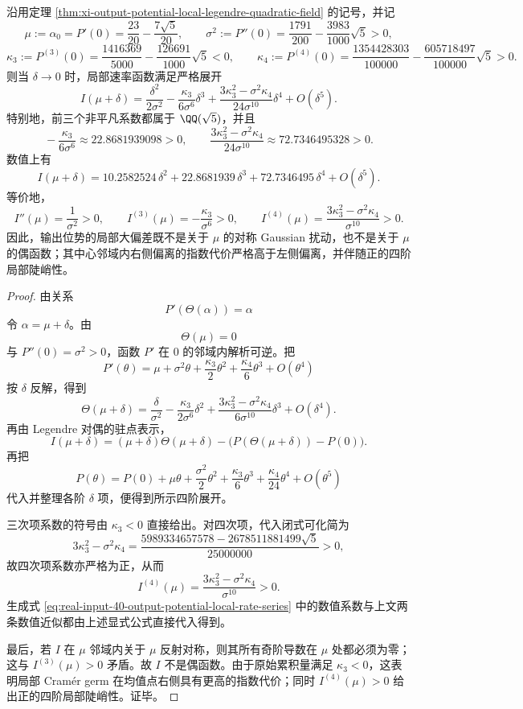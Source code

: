 \begin{theorem}[输出位势大偏差率函数的局部非对称精确展开]\label{thm:xi-output-potential-local-legendre-skew-steep}
沿用定理 \ref{thm:xi-output-potential-local-legendre-quadratic-field} 的记号，并记
\[
\mu:=\alpha_0=P'(0)=\frac{23}{20}-\frac{7\sqrt5}{20},
\qquad
\sigma^2:=P''(0)=\frac{1791}{200}-\frac{3983}{1000}\sqrt5>0,
\]
\[
\kappa_3:=P^{(3)}(0)=\frac{1416369}{5000}-\frac{126691}{1000}\sqrt5<0,
\qquad
\kappa_4:=P^{(4)}(0)=\frac{1354428303}{100000}-\frac{605718497}{100000}\sqrt5>0.
\]
则当 \(\delta\to 0\) 时，局部速率函数满足严格展开
\[
\boxed{\;
I(\mu+\delta)
=
\frac{\delta^2}{2\sigma^2}
-\frac{\kappa_3}{6\sigma^6}\delta^3
+\frac{3\kappa_3^2-\sigma^2\kappa_4}{24\sigma^{10}}\delta^4
+O(\delta^5).\;}
\]
特别地，前三个非平凡系数都属于 \(\QQ(\sqrt5)\)，并且
\[
\boxed{\;
-\frac{\kappa_3}{6\sigma^6}\approx 22.8681939098>0,\qquad
\frac{3\kappa_3^2-\sigma^2\kappa_4}{24\sigma^{10}}\approx 72.7346495328>0.\;}
\]
数值上有
\begin{equation}
\label{eq:real-input-40-output-potential-local-rate-series}
I(\mu+\delta)=10.2582524\,\delta^2+22.8681939\,\delta^3+72.7346495\,\delta^4+O(\delta^5).
\end{equation}
等价地，
\[
I''(\mu)=\frac{1}{\sigma^2}>0,\qquad
I^{(3)}(\mu)= -\frac{\kappa_3}{\sigma^6}>0,\qquad
I^{(4)}(\mu)=\frac{3\kappa_3^2-\sigma^2\kappa_4}{\sigma^{10}}>0.
\]
因此，输出位势的局部大偏差既不是关于 \(\mu\) 的对称 Gaussian 扰动，也不是关于 \(\mu\) 的偶函数；其中心邻域内右侧偏离的指数代价严格高于左侧偏离，并伴随正的四阶局部陡峭性。
\end{theorem}
\begin{proof}
由关系
\[
P'(\Theta(\alpha))=\alpha
\]
令 \(\alpha=\mu+\delta\)。由
\[
\Theta(\mu)=0
\]
与 \(P''(0)=\sigma^2>0\)，函数 \(P'\) 在 \(0\) 的邻域内解析可逆。把
\[
P'(\theta)
=
\mu+\sigma^2\theta+\frac{\kappa_3}{2}\theta^2+\frac{\kappa_4}{6}\theta^3+O(\theta^4)
\]
按 \(\delta\) 反解，得到
\[
\Theta(\mu+\delta)
=
\frac{\delta}{\sigma^2}
-\frac{\kappa_3}{2\sigma^6}\delta^2
+\frac{3\kappa_3^2-\sigma^2\kappa_4}{6\sigma^{10}}\delta^3
+O(\delta^4).
\]
再由 Legendre 对偶的驻点表示，
\[
I(\mu+\delta)
=
(\mu+\delta)\Theta(\mu+\delta)-\bigl(P(\Theta(\mu+\delta))-P(0)\bigr).
\]
再把
\[
P(\theta)
=
P(0)+\mu\theta+\frac{\sigma^2}{2}\theta^2+\frac{\kappa_3}{6}\theta^3+\frac{\kappa_4}{24}\theta^4+O(\theta^5)
\]
代入并整理各阶 \(\delta\) 项，便得到所示四阶展开。

三次项系数的符号由 \(\kappa_3<0\) 直接给出。对四次项，代入闭式可化简为
\[
3\kappa_3^2-\sigma^2\kappa_4
=
\frac{5989334657578-2678511881499\sqrt5}{25000000}
>0,
\]
故四次项系数亦严格为正，从而
\[
I^{(4)}(\mu)=\frac{3\kappa_3^2-\sigma^2\kappa_4}{\sigma^{10}}>0.
\]
生成式
\eqref{eq:real-input-40-output-potential-local-rate-series}
中的数值系数与上文两条数值近似都由上述显式公式直接代入得到。

最后，若 \(I\) 在 \(\mu\) 邻域内关于 \(\mu\) 反射对称，则其所有奇阶导数在 \(\mu\) 处都必须为零；这与
\(
I^{(3)}(\mu)>0
\)
矛盾。故 \(I\) 不是偶函数。由于原始累积量满足 \(\kappa_3<0\)，这表明局部 Cram\'er germ 在均值点右侧具有更高的指数代价；同时 \(I^{(4)}(\mu)>0\) 给出正的四阶局部陡峭性。证毕。
\end{proof}

